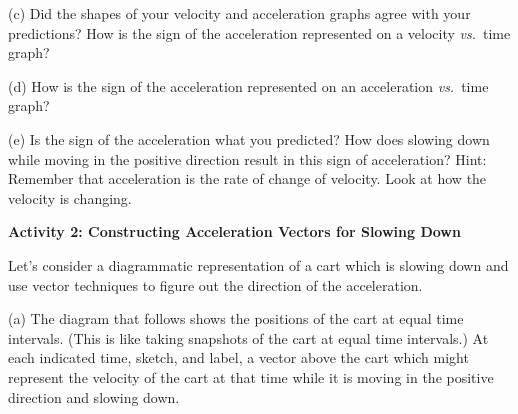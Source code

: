 (c) Did the shapes of your velocity and acceleration graphs agree with your predictions? How is the sign of the acceleration represented on a velocity \textit{vs.}~time graph? 
\answerspace{15mm}

(d) How is the sign of the acceleration represented on an acceleration \textit{vs.}~time
graph? 
\answerspace{15mm}

\pagebreak[3]
(e) Is the sign of the acceleration what you predicted? How does slowing down while moving in the positive direction result in this sign of acceleration? Hint: Remember that acceleration is the rate of change of velocity. Look at how the velocity is changing.
\answerspace{20mm}

\textbf{Activity 2: Constructing Acceleration Vectors for Slowing Down}

Let's consider a diagrammatic representation of a cart which is slowing down
and use vector techniques to figure out the direction of the acceleration.


(a) The diagram that follows shows the positions of the cart at equal time intervals.
(This is like taking snapshots of the cart at equal time intervals.) At each
indicated time, sketch, and label, a vector above the cart which might represent the velocity
of the cart at that time while it is moving in the positive direction and slowing down.

